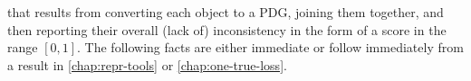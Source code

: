 %
that results from converting each object to a PDG, 
    joining them together, 
    and then reporting their overall (lack of) inconsistency in the form
    of a score in the range $[0,1]$. 
The following facts are either immediate or follow immediately from a result in \cref{chap:repr-tools} or \ref{chap:one-true-loss}.
